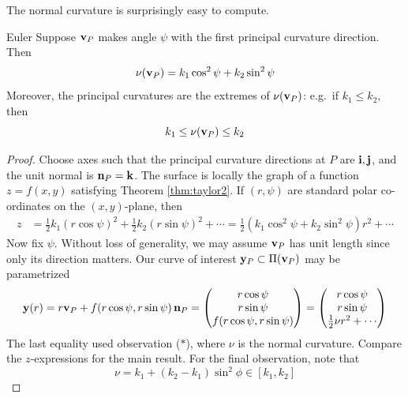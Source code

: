 
\goodbreak

The normal curvature is surprisingly easy to compute.

\begin{thm}{Euler}{}
Suppose ${\mathbf{v}}_P$ makes angle $\psi$ with the first principal curvature direction. Then %
\[\nu({\mathbf{v}}_P)=k_1\cos^2\psi +k_2\sin^2\psi\]
Moreover, the principal curvatures are the extremes of $\nu({\mathbf{v}}_P)$: e.g.\ if $k_1\le k_2$, then
\[k_1\le\nu({\mathbf{v}}_P)\le k_2\]
\end{thm}

\begin{proof}
Choose axes such that the principal curvature directions at $P$ are ${\mathbf{i}},{\mathbf{j}}$, and the unit normal is ${\mathbf{n}}_P={\mathbf{k}}$. The surface is locally the graph of a function $z=f(x,y)$ satisfying Theorem \ref{thm:taylor2}. If $(r,\psi)$ are standard polar co-ordinates on the $(x,y)$-plane, then 
	\begin{align*}
		z&=\tfrac{1}{2}k_1(r\cos\psi)^2+\tfrac{1}{2}k_2(r\sin\psi)^2+\cdots= \frac 12(k_1\cos^2\psi+k_2\sin^2\psi)r^2+\cdots
	\end{align*}
Now fix $\psi$. Without loss of generality, we may assume ${\mathbf{v}}_P$ has unit length since only its direction matters. Our curve of interest ${\mathbf{y}}_P\subset\Pi({\mathbf{v}}_P)$ may be parametrized
	\[{\mathbf{y}}(r)= r{\mathbf{v}}_P+f(r\cos\psi,r\sin\psi)\,{\mathbf{n}}_P= \begin{pmatrix}r\cos\psi\\r\sin\psi\\f(r\cos\psi,r\sin\psi)\end{pmatrix}=\begin{pmatrix}r\cos\psi\\r\sin\psi\\\frac 12\nu r^2+\cdots\end{pmatrix}
	\]
	The last equality used observation ($\ast$), where $\nu$ is the normal curvature. Compare the $z$-expressions for the main result. For the final observation, note that
	\[\nu=k_1+(k_2-k_1)\sin^2\phi\in[k_1,k_2]\tag*{\qedhere}\]
\end{proof}



